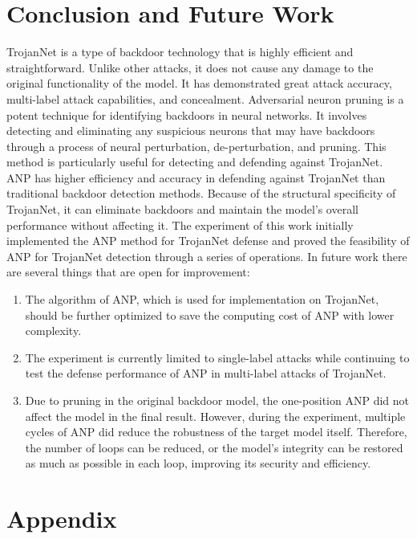 \documentclass[english,version-2022-01]{uzl-thesis}
\begin{document}
\chapter{Conclusion and Future Work} TrojanNet is a type of backdoor technology that is highly efficient and straightforward. Unlike other attacks, it does not cause any damage to the original functionality of the model. It has demonstrated great attack accuracy, multi-label attack capabilities, and concealment. Adversarial neuron pruning is a potent technique for identifying backdoors in neural networks. It involves detecting and eliminating any suspicious neurons that may have backdoors through a process of neural perturbation, de-perturbation, and pruning. This method is particularly useful for detecting and defending against TrojanNet. ANP has higher efficiency and accuracy in defending against TrojanNet than traditional backdoor detection methods. Because of the structural specificity of TrojanNet, it can eliminate backdoors and maintain the model's overall performance without affecting it. The experiment of this work initially implemented the ANP method for TrojanNet defense and proved the feasibility of ANP for TrojanNet detection through a series of operations. In future work there are several things that are open for improvement: 
\begin{enumerate}
    \item The algorithm of ANP, which is used for implementation on TrojanNet, should be further optimized to save the computing cost of ANP with lower complexity.
    \item The experiment is currently limited to single-label attacks while continuing to test the defense performance of ANP in multi-label attacks of TrojanNet.
    \item Due to pruning in the original backdoor model, the one-position ANP did not affect the model in the final result. However, during the experiment, multiple cycles of ANP did reduce the robustness of the target model itself. Therefore, the number of loops can be reduced, or the model's integrity can be restored as much as possible in each loop, improving its security and efficiency.
\end{enumerate}
\newpage
\appendix
\chapter{Appendix}
\end{document}
